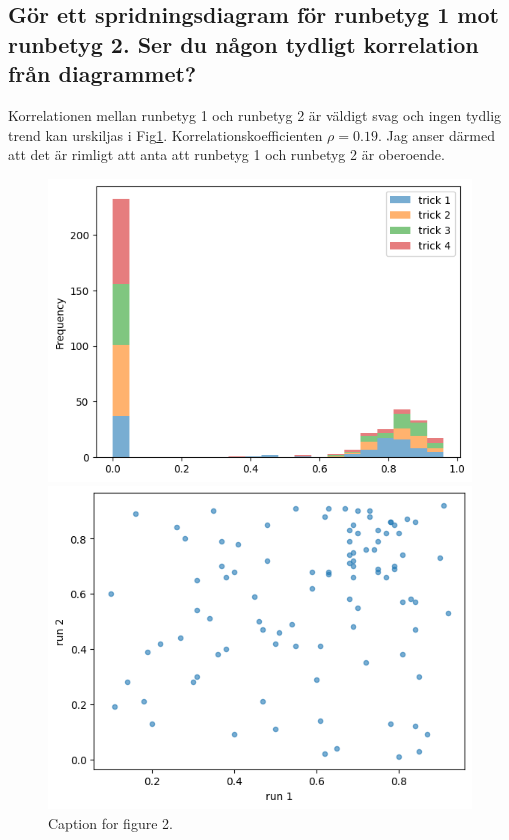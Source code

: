 \documentclass{article}
\begin{document}
\subsection{Gör ett spridningsdiagram för runbetyg 1 mot runbetyg 2. Ser du någon tydligt korrelation från diagrammet?} \label{sec:1e}

Korrelationen mellan runbetyg 1 och runbetyg 2 är väldigt svag och ingen tydlig trend kan urskiljas i Fig\ref{fig:1e}.
Korrelationskoefficienten $\rho = 0.19$. Jag anser därmed att det är rimligt att anta att runbetyg 1 och runbetyg 2 är oberoende.

\clearpage  %

\begin{figure}[htbp]
    \centering
    
    \begin{minipage}{0.45\textwidth}
        \centering
        \includegraphics[width=\textwidth]{Figures/1b.png}
        \caption{Histogram för trickbetyg 1-4.}
        \label{fig:1b}
    \end{minipage}
    \hfill
    \begin{minipage}{0.45\textwidth}
        \centering
        \includegraphics[width=\textwidth]{Figures/1e.png}
        \caption{Caption for figure 2.}
        \label{fig:1e}
    \end{minipage}
    
\end{figure}
\end{document}
